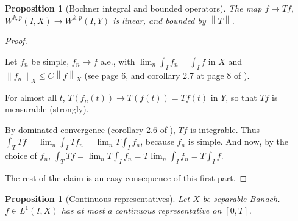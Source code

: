 \documentclass[english,a4paper,10pt,oneside]{scrbook}	%
\theoremstyle{break}
\newtheorem{cor}[equation]{Corollary}
\newtheorem{prop}[equation]{Proposition}
\newenvironment{mproof}[1][\proofname]{%
  \begin{proof}[#1]$ $\par\nobreak\ignorespaces
}{%
  \end{proof}
}
\renewcommand*{\proofname}{Proof}
\theoremstyle{remark}
\newcommand{\mR}{\mathbb{R}}
\newcommand{\norm}[1]{\left\lVert#1\right\rVert}
\begin{document}
\begin{appendices}
\begin{prop}[Bochner integral and bounded operators]
The map $f \mapsto Tf$, $W^{k,p}(I,X)\rightarrow W^{k,p}(I,Y)$ is linear, and bounded by $\norm{T}$.

\end{prop}
\begin{mproof}

Let $f_n$ be simple, $f_n\rightarrow f $ a.e., with $\lim_n \int_I f_n = \int_I f$ in $X$ and $\norm{f_n}_X \leq C \norm{f}_X$ (see page 6, and corollary 2.7 at page 8 of \cite{kreuter}).

For almost all $t$, $T(f_n(t)) \rightarrow T(f(t))=Tf(t)$ in $Y$, so that $Tf$ is measurable (strongly).

By dominated convergence (corollary 2.6 of \cite{kreuter}), $Tf$ is integrable. Thus $\int_T Tf = \lim_n \int_I  Tf_n = \lim_n T\int_I  f_n$, because $f_n$ is simple. And now, by the choice of $f_n$, $\int_T Tf = \lim_n T\int_I  f_n = T \lim_n \int_I  f_n = T \int_I f$.

The rest of the claim is an easy consequence of this first part.
\end{mproof}

%
%
%
%
%

\begin{prop}[Continuous representatives]
\label{prop:cts_repr}
Let $X$ be separable Banach. $f \in L^1(I,X)$ has at most a continuous representative on $[0,T]$.
\end{prop}


\end{appendices}
\end{document}
